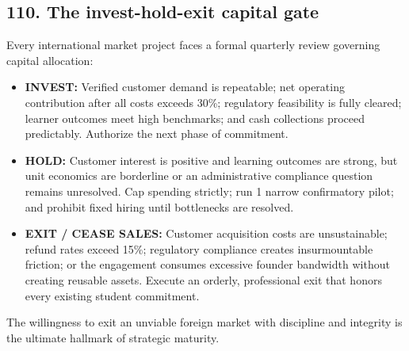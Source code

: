 \subsection{110. The invest-hold-exit capital gate}

Every international market project faces a formal quarterly review governing capital allocation:
\begin{itemize}
    \item \textbf{INVEST:} Verified customer demand is repeatable; net operating contribution after all costs exceeds 30\%; regulatory feasibility is fully cleared; learner outcomes meet high benchmarks; and cash collections proceed predictably. Authorize the next phase of commitment.
    \item \textbf{HOLD:} Customer interest is positive and learning outcomes are strong, but unit economics are borderline or an administrative compliance question remains unresolved. Cap spending strictly; run 1 narrow confirmatory pilot; and prohibit fixed hiring until bottlenecks are resolved.
    \item \textbf{EXIT / CEASE SALES:} Customer acquisition costs are unsustainable; refund rates exceed 15\%; regulatory compliance creates insurmountable friction; or the engagement consumes excessive founder bandwidth without creating reusable assets. Execute an orderly, professional exit that honors every existing student commitment.
\end{itemize}
The willingness to exit an unviable foreign market with discipline and integrity is the ultimate hallmark of strategic maturity.
